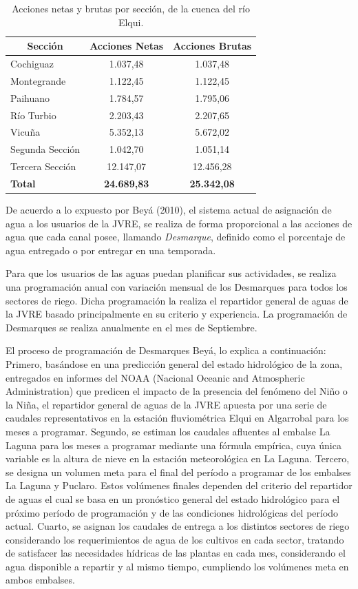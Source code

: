 \documentclass[11pt,]{article}
\begin{document}
\begin{table}[H]
\centering
\caption{Acciones netas y brutas por sección, de la cuenca del río Elqui.}
\label{my-label3}
\begin{tabular}{@{}lcc@{}}
\toprule
\multicolumn{1}{c}{\textbf{Sección}} & \textbf{Acciones Netas} & \textbf{Acciones Brutas} \\ \midrule
Cochiguaz & 1.037,48 & 1.037,48 \\
Montegrande & 1.122,45 & 1.122,45 \\
Paihuano & 1.784,57 & 1.795,06 \\
Río Turbio & 2.203,43 & 2.207,65 \\
Vicuña & 5.352,13 & 5.672,02 \\
Segunda Sección & 1.042,70 & 1.051,14 \\
Tercera Sección & 12.147,07 & 12.456,28 \\ \midrule
\textbf{Total} & \textbf{24.689,83} & \textbf{25.342,08} \\ \bottomrule
\end{tabular}
\end{table}
	
	De acuerdo a lo expuesto por Beyá (2010), el sistema actual de asignación de agua a los usuarios de la JVRE, se realiza de forma proporcional a las acciones de agua que cada canal posee, llamando \textit{Desmarque}, definido como el porcentaje de agua entregado o por entregar en una temporada.\bigskip
	
	Para que los usuarios de las aguas puedan planificar sus actividades, se realiza una programación anual con variación mensual de los Desmarques para todos los sectores de riego. Dicha programación la realiza el repartidor general de aguas de la JVRE basado principalmente en su criterio y experiencia. La programación de Desmarques se realiza anualmente en el mes de Septiembre.\bigskip
	
	 El proceso de programación de Desmarques Beyá, lo explica a continuación: Primero, basándose en una predicción general del estado hidrológico de la zona, entregados en informes del NOAA (Nacional Oceanic and Atmospheric Administration) que predicen el impacto de la presencia del fenómeno del Niño o la Niña, el repartidor general de aguas de la JVRE apuesta por una serie de caudales representativos en la estación fluviométrica Elqui en Algarrobal para los meses a programar. Segundo, se estiman los caudales afluentes al embalse La Laguna para los meses a programar mediante una fórmula empírica, cuya única variable es la altura de nieve en la estación meteorológica en La Laguna. Tercero, se designa un volumen meta para el final del período a programar de los embalses La Laguna y Puclaro. Estos volúmenes finales dependen del criterio del repartidor de aguas el cual se basa en un pronóstico general del estado hidrológico para el próximo período de programación y de las condiciones hidrológicas del período actual. Cuarto, se asignan los caudales de entrega a los distintos sectores de riego considerando los requerimientos de agua de los cultivos en cada sector, tratando de satisfacer las necesidades hídricas de las plantas en cada mes, considerando el agua disponible a repartir y al mismo tiempo, cumpliendo los volúmenes meta en ambos embalses. \bigskip
	 
\end{document}
